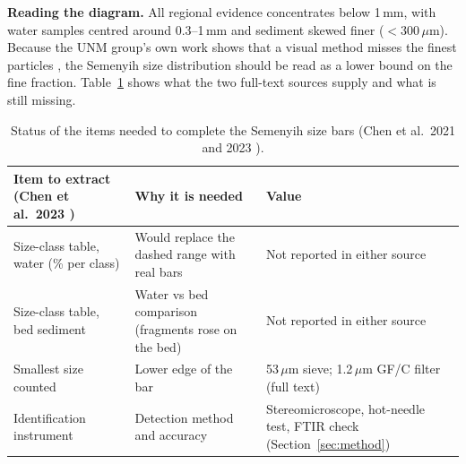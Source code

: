 \documentclass[11pt,a4paper]{article}
\newcommand{\um}{\,\ensuremath{\mu}m}
\begin{document}
\noindent\textbf{Reading the diagram.} All regional evidence concentrates below 1\,mm, with water samples centred around 0.3--1\,mm and sediment skewed finer ($<$300\um). Because the UNM group's own work shows that a visual method misses the finest particles \cite{ng24}, the Semenyih size distribution should be read as a lower bound on the fine fraction. Table~\ref{tab:fill} shows what the two full-text sources supply and what is still missing.

\begin{table}[H]\centering\small
\begin{tabularx}{\textwidth}{@{}lXl@{}}
\toprule Item to extract (Chen et al.\ 2023 \cite{chen23}) & Why it is needed & Value \\\midrule
Size-class table, water (\% per class) & Would replace the dashed range with real bars & Not reported in either source \\
Size-class table, bed sediment & Water vs bed comparison (fragments rose on the bed) & Not reported in either source \\
Smallest size counted & Lower edge of the bar & 53\um{} sieve; 1.2\um{} GF/C filter (full text) \\
Identification instrument & Detection method and accuracy & Stereomicroscope, hot-needle test, FTIR check (Section~\ref{sec:method}) \\
\bottomrule\end{tabularx}
\caption{Status of the items needed to complete the Semenyih size bars (Chen et al.\ 2021 and 2023 \cite{chen21a,chen23}).}\label{tab:fill}
\end{table}
\end{document}

